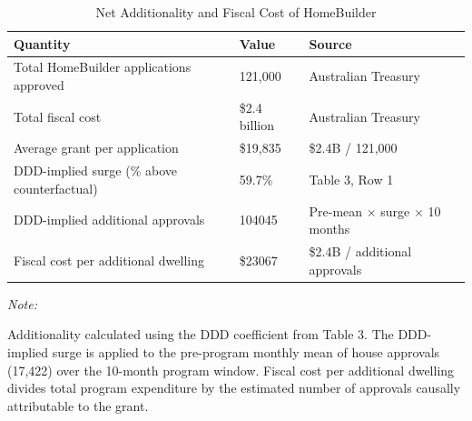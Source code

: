 \begin{table}[!h]
\centering
\caption{\label{tab:additionality}Net Additionality and Fiscal Cost of HomeBuilder}
\centering
\begin{threeparttable}
\footnotesize
\begin{tabular}[t]{lll}
\toprule
Quantity & Value & Source\\
\midrule
Total HomeBuilder applications approved & 121,000 & Australian Treasury\\
Total fiscal cost & \$2.4 billion & Australian Treasury\\
Average grant per application & \$19,835 & \$2.4B / 121,000\\
DDD-implied surge (\% above counterfactual) & 59.7\% & Table 3, Row 1\\
DDD-implied additional approvals & 104045 & Pre-mean $\times$ surge $\times$ 10 months\\
\addlinespace
Fiscal cost per additional dwelling & \$23067 & \$2.4B / additional approvals\\
\bottomrule
\end{tabular}
\begin{tablenotes}
\item \textit{Note: } 
\item Additionality calculated using the DDD coefficient from Table 3. The DDD-implied surge is applied to the pre-program monthly mean of house approvals (17,422) over the 10-month program window. Fiscal cost per additional dwelling divides total program expenditure by the estimated number of approvals causally attributable to the grant.
\end{tablenotes}
\end{threeparttable}
\end{table}
